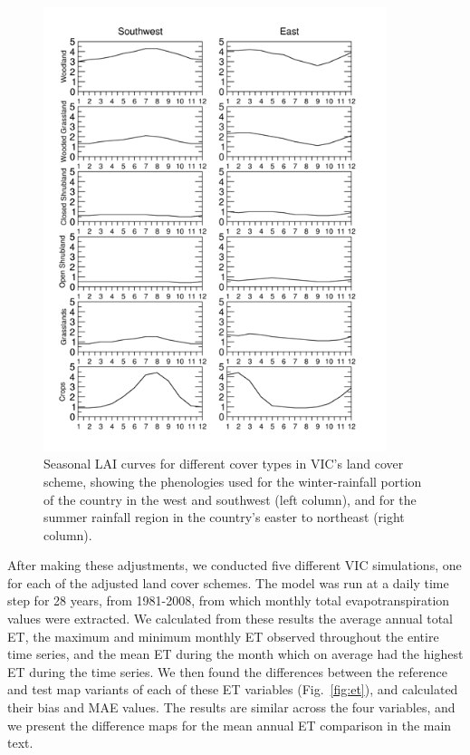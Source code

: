 \documentclass[12pt, titlepage]{article}
\begin{document}
\begin{figure}[!ht]
  \centering
     \includegraphics[width = 10cm]{figures/lai_seasonal_cycles.png} 
      \caption{Seasonal LAI curves for different cover types in VIC's land cover scheme, showing the phenologies used for the winter-rainfall portion of the country in the west and southwest (left column), and for the summer rainfall region in the country's easter to northeast (right column). }
      \label{fig:lai}
\end{figure}

After making these adjustments, we conducted five different VIC simulations, one for each of the adjusted land cover schemes. The model was run at a daily time step for 28 years, from 1981-2008, from which monthly total evapotranspiration values were extracted.  We calculated from these results the average annual total ET, the maximum and minimum monthly ET observed throughout the entire time series, and the mean ET during the month which on average had the highest ET during the time series. We then found the differences between the reference and test map variants of each of these ET variables (Fig.~\ref{fig:et}), and calculated their bias and MAE values. The results are similar across the four variables, and we present the difference maps for the mean annual ET comparison in the main text.  
\end{document}
